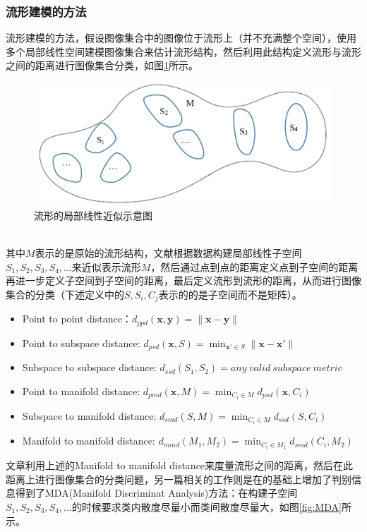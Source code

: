 \subsubsection{流形建模的方法}
\label{sec:current_SubMan_Manifold}
流形建模的方法\cite{Manifold_MMD}，\cite{Manifold_MDA}假设图像集合中的图像位于流形上（并不充满整个空间），使用多个局部线性空间建模图像集合来估计流形结构，然后利用此结构定义流形与流形之间的距离进行图像集合分类，如图\ref{fig:MMD}所示。
\begin{figure}[h]
	\centering
	\includegraphics[width=0.7\linewidth]{source/MMD.png}
	\caption{流形的局部线性近似示意图}
	\label{fig:MMD}
\end{figure}\\
其中$M$表示的是原始的流形结构，文献\cite{Manifold_MMD}根据数据构建局部线性子空间$S_1,S_2,S_3,S_4,...$来近似表示流形$M$，然后通过点到点的距离定义点到子空间的距离再进一步定义子空间到子空间的距离，最后定义流形到流形的距离，从而进行图像集合的分类（下述定义中的$S,S_{i},C_{j}$表示的的是子空间而不是矩阵）。
\begin{itemize}
\item Point to point distance：$d_{ppd} (\bm{x},\bm{y})=\|\bm{x}-\bm{y}\|$
\item Point to subspace distance: $d_{psd} (\bm{x},S)=\min_{\bm{x}'\in S}\|\bm{x}-\bm{x}'\|$
\item Subspace to subspace distance: $d_{ssd} (S_1,S_2)= any~valid~subspace~metric$
\item Point to manifold distance: $d_{pmd} (\bm{x},M)=\min_{C_i\in M}d_{psd} (\bm{x},C_i )$
\item Subspace to manifold distance: $d_{smd} (S,M)=\min_{C_i\in M}d_{ssd} (S,C_i )$
\item Manifold to manifold distance: $d_{mmd} (M_1,M_2 )=\min_{C_i\in M_1}d_{smd} (C_i,M_2 )$
\end{itemize}
文章\cite{Manifold_MMD}利用上述的Manifold to manifold distance来度量流形之间的距离，然后在此距离上进行图像集合的分类问题，另一篇相关的工作\cite{Manifold_MDA}则是在\cite{Manifold_MMD}的基础上增加了判别信息得到了MDA(Manifold Discriminat Analysis)方法：在构建子空间$S_1,S_2,S_3,S_4,...$的时候要求类内散度尽量小而类间散度尽量大，如图\ref{fig:MDA}所示。
